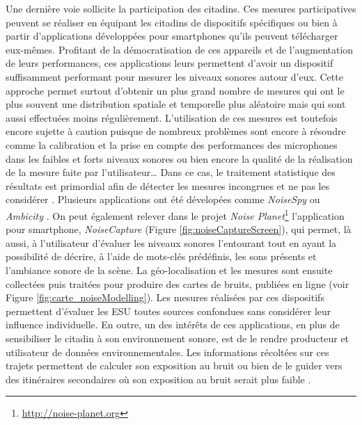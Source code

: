 Une dernière voie sollicite la participation des citadins. Ces mesures participatives peuvent se réaliser en équipant les citadins de dispositifs spécifiques \cite{delaitre2014influence} ou bien à partir d'applications développées pour smartphones qu'ils peuvent télécharger eux-mêmes. Profitant de la démocratisation de ces appareils et de l'augmentation de leurs performances, ces applications leurs permettent d'avoir un dispositif suffisamment performant pour mesurer les niveaux sonores autour d'eux. Cette approche permet surtout d'obtenir un plus grand nombre de mesures qui ont le plus souvent une distribution spatiale et temporelle plus aléatoire mais qui sont aussi effectuées moins régulièrement. L'utilisation de ces mesures est toutefois encore sujette à caution puisque de nombreux problèmes sont encore à résoudre comme la calibration et la prise en compte des performances des microphones dans les faibles et forts niveaux sonores \cite{aumond2017study} ou bien encore la qualité de la réalisation de la mesure faite par l'utilisateur\dots{} Dans ce cas, le traitement statistique des résultats est primordial afin de détecter les mesures incongrues et ne pas les considérer \cite{guillaume2016noise}. Plusieurs applications ont été dévelopées comme \textit{NoiseSpy} \cite{kanjo_noisespy_2010} ou \textit{Ambicity} \cite{ventura2017estimation}. On peut également relever dans le projet \textit{Noise Planet}\footnote{\url{http://noise-planet.org}} l'application pour smartphone, \textit{NoiseCapture} \cite{guillaume2016noise} (Figure \ref{fig:noiseCaptureScreen}), qui permet, là aussi, à l'utilisateur d'évaluer les niveaux sonores l'entourant tout en ayant la possibilité de décrire, à l'aide de mots-clés prédéfinis, les sons présents et l'ambiance sonore de la scène. La géo-localisation et les mesures sont ensuite collectées puis traitées pour produire des cartes de bruits, publiées en ligne (voir Figure \ref{fig:carte_noiseModelling}). 
Les mesures réalisées par ces dispositifs permettent d'évaluer les ESU toutes sources confondues sans considérer leur influence individuelle. 
En outre, un des intérêts de ces applications, en plus de sensibiliser le citadin à son environnement sonore, est de le rendre producteur et utilisateur de données environnementales. Les informations récoltées sur ces trajets permettent de calculer son exposition au bruit ou bien de le guider vers des itinéraires secondaires où son exposition au bruit serait plus faible \cite{aumond2016sound}.\\


